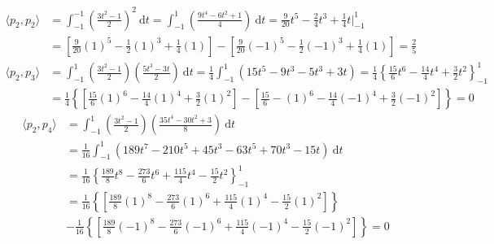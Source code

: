 \begin{align*}
\langle p_2,p_2 \rangle &= \int_{-1}^{-1}\left(\frac{3t^2-1}{2}\right)^2\:\mathrm{d}t = \int_{-1}^{1} \left(\frac{9t^4-6t^2+1}{4}\right)\:\mathrm{d}t
= \frac{9}{20}t^5-\frac{2}{4}t^3+\frac{1}{4}t\Big|_{-1}^{1} \\ &= \left[\frac{9}{20}(1)^5-\frac{1}{2}(1)^3+\frac{1}{4}(1)\right] - \left[\frac{9}{20}(-1)^5-\frac{1}{2}(-1)^3+\frac{1}{4}(1)\right] = \boxed{\frac{2}{5}} \\
\langle p_2,p_3 \rangle &= \int_{-1}^{1}\left(\frac{3t^2-1}{2}\right)\left(\frac{5t^3-3t}{2}\right)\:\mathrm{d}t = \frac{1}{4}\int_{-1}^{1}\left(15t^5-9t^3-5t^3+3t\right) = \frac{1}{4}\left\lbrace\frac{15}{6}t^6-\frac{14}{4}t^4+\frac{3}{2}t^2\right\rbrace_{-1}^{1}\\ &= \frac{1}{4}\left\lbrace\left[\frac{15}{6}(1)^6-\frac{14}{4}(1)^4+\frac{3}{2}(1)^2\right] - \left[\frac{15}{6}-(1)^6-\frac{14}{4}(-1)^4+\frac{3}{2}(-1)^2\right]\right\rbrace = \boxed{0}
\end{align*}
\begin{align*}
\langle p_2,p_4 \rangle &= \int_{-1}^{1}\left(\frac{3t^2-1}{2}\right)\left(\frac{35t^4-30t^2+3}{8}\right)\:\mathrm{d}t\\ &= \frac{1}{16} \int_{-1}^{1} \left(189t^7-210t^5+45t^3-63t^5+70t^3-15t\right)\:\mathrm{d}t\\ &= \frac{1}{16}\left\lbrace\frac{189}{8}t^8-\frac{273}{6}t^6+\frac{115}{4}t^4-\frac{15}{2}t^2\right\rbrace_{-1}^{1} \\
&= \frac{1}{16}\left\lbrace\left[\frac{189}{8}(1)^8-\frac{273}{6}(1)^6+\frac{115}{4}(1)^4-\frac{15}{2}(1)^2\right]\right\rbrace\\ &-\frac{1}{16}\left\lbrace\left[\frac{189}{8}(-1)^8-\frac{273}{6}(-1)^6+\frac{115}{4}(-1)^4-\frac{15}{2}(-1)^2\right]\right\rbrace = \boxed{0}
\end{align*}
